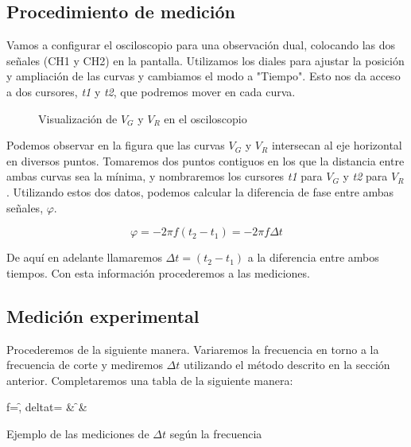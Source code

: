 \documentclass[12pt, a4paper, titlepage]{article}
\begin{document}
  \subsection{Procedimiento de medición}

  Vamos a configurar el osciloscopio para una observación dual, colocando las dos señales (CH1 y CH2) en la pantalla. Utilizamos los diales para ajustar la posición y ampliación de las curvas y cambiamos el modo a "Tiempo". Esto nos da acceso a dos cursores, \textit{t1} y \textit{t2}, que podremos mover en cada curva.

  \begin{figure}[H]
    \centering
    
    \caption{Visualización de $V_G$ y $V_R$ en el osciloscopio}
  \end{figure}

  Podemos observar en la figura que las curvas $V_G$ y $V_R$ intersecan al eje horizontal en diversos puntos. Tomaremos dos puntos contiguos en los que la distancia entre ambas curvas sea la mínima, y nombraremos los cursores \textit{t1} para $V_G$ y \textit{t2} para $V_R$. Utilizando estos dos datos, podemos calcular la diferencia de fase entre ambas señales, $\varphi$.

  \begin{equation}
    \varphi = -2\pi f (t_2 - t_1) = -2\pi f \Delta t
    \label{ec:desfase}
  \end{equation}

  De aquí en adelante llamaremos $\Delta t = (t_2 - t_1)$ a la diferencia entre ambos tiempos. Con esta información procederemos a las mediciones.

  \subsection{Medición experimental}

  Procederemos de la siguiente manera. Variaremos la frecuencia en torno a la frecuencia de corte y mediremos $\Delta t$ utilizando el método descrito en la sección anterior. Completaremos una tabla de la siguiente manera:

  \begin{table}[H]
  \centering
    {f=\f, deltat=\dt}
    {\thecsvrow & \f & \dt}
  \caption{Ejemplo de las mediciones de $\Delta t$ según la frecuencia}
  \end{table}
\end{document}
